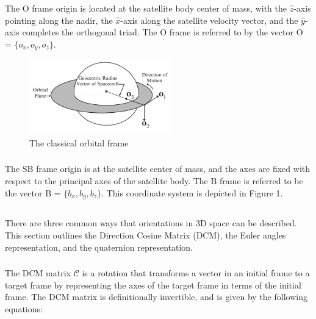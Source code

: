 \documentclass{article}
\begin{document}
The O frame origin is located at the satellite body center of mass, with the $\hat{z}$-axis pointing along the nadir, the $\hat{x}$-axis along the satellite velocity vector, and the $\hat{y}$-axis completes the orthogonal triad. The O frame is referred to by the vector O = $\{o_{x}, o_{y}, o_{z}\}$.

\begin{figure}[H]
    \centering
    \includegraphics[width=0.55\textwidth]{Orbital Frame.png}
    \caption{The classical orbital frame \cite{SMAD}}
    \label{fig:enter-label}
\end{figure}

\subsubsection{\color{black}{Satellite Body (B) Frame}}

The SB frame origin is at the satellite center of mass, and the axes are fixed with respect to the principal axes of the satellite body. The B frame is referred to be the vector B = $\{b_{x}, b_{y}, b_{z}\}$. This coordinate system is depicted in Figure 1. 

\subsection{\color{black}{Attitude Representation}}

There are three common ways that orientations in 3D space can be described. This section outlines the Direction Cosine Matrix (DCM), the Euler angles representation, and the quaternion representation. 

\subsubsection{\color{black}{Direction Cosine Matrix}}

The DCM matrix $\mathcal{C}$ is a rotation that transforms a vector in an initial frame to a target frame by representing the axes of the target frame in terms of the initial frame. The DCM matrix is definitionally invertible, and is given by the following equations:
\end{document}

